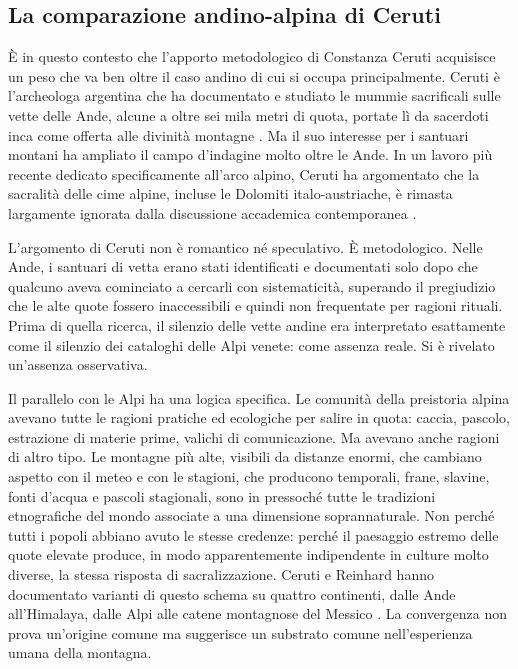 \subsection*{La comparazione andino-alpina di Ceruti}

È in questo contesto che l'apporto metodologico di Constanza Ceruti acquisisce un peso che va ben oltre il caso andino di cui si occupa principalmente. Ceruti è l'archeologa argentina che ha documentato e studiato le mummie sacrificali sulle vette delle Ande, alcune a oltre sei mila metri di quota, portate lì da sacerdoti inca come offerta alle divinità montagne \citep{reinhard2010}. Ma il suo interesse per i santuari montani ha ampliato il campo d'indagine molto oltre le Ande. In un lavoro più recente dedicato specificamente all'arco alpino, Ceruti ha argomentato che la sacralità delle cime alpine, incluse le Dolomiti italo-austriache, è rimasta largamente ignorata dalla discussione accademica contemporanea \citep{ceruti2025}.

L'argomento di Ceruti non è romantico né speculativo. È metodologico. Nelle Ande, i santuari di vetta erano stati identificati e documentati solo dopo che qualcuno aveva cominciato a cercarli con sistematicità, superando il pregiudizio che le alte quote fossero inaccessibili e quindi non frequentate per ragioni rituali. Prima di quella ricerca, il silenzio delle vette andine era interpretato esattamente come il silenzio dei cataloghi delle Alpi venete: come assenza reale. Si è rivelato un'assenza osservativa.

Il parallelo con le Alpi ha una logica specifica. Le comunità della preistoria alpina avevano tutte le ragioni pratiche ed ecologiche per salire in quota: caccia, pascolo, estrazione di materie prime, valichi di comunicazione. Ma avevano anche ragioni di altro tipo. Le montagne più alte, visibili da distanze enormi, che cambiano aspetto con il meteo e con le stagioni, che producono temporali, frane, slavine, fonti d'acqua e pascoli stagionali, sono in pressoché tutte le tradizioni etnografiche del mondo associate a una dimensione soprannaturale. Non perché tutti i popoli abbiano avuto le stesse credenze: perché il paesaggio estremo delle quote elevate produce, in modo apparentemente indipendente in culture molto diverse, la stessa risposta di sacralizzazione. Ceruti e Reinhard hanno documentato varianti di questo schema su quattro continenti, dalle Ande all'Himalaya, dalle Alpi alle catene montagnose del Messico \citep{reinhard2010}. La convergenza non prova un'origine comune ma suggerisce un substrato comune nell'esperienza umana della montagna.

